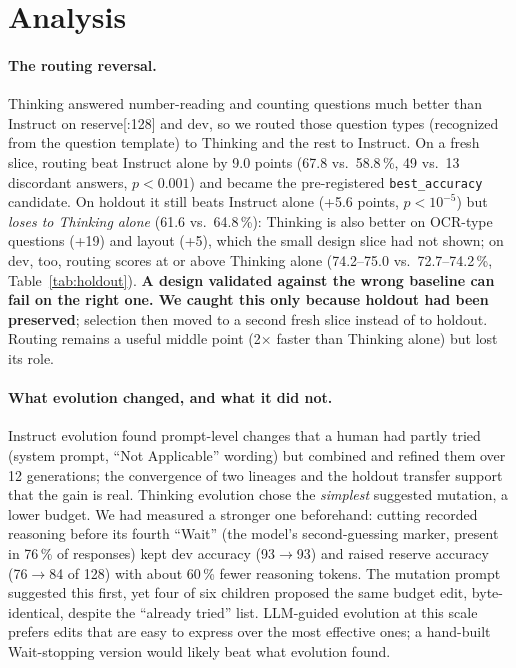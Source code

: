 \documentclass{article}
\begin{document}
\section{Analysis}

\paragraph{The routing reversal.} Thinking answered number-reading and counting questions much better than Instruct
on reserve[:128] and dev, so we routed those question types (recognized from the question template) to Thinking and
the rest to Instruct. On a fresh slice, routing beat Instruct alone by 9.0 points (67.8 vs.\ 58.8\,\%, 49 vs.\ 13
discordant answers, $p<0.001$) and became the pre-registered \texttt{best\_accuracy} candidate. On holdout it still
beats Instruct alone (+5.6 points, $p<10^{-5}$) but \emph{loses to Thinking alone} (61.6 vs.\ 64.8\,\%): Thinking is
also better on OCR-type questions (+19) and layout (+5), which the small design slice had not shown; on dev, too, routing scores at or above Thinking alone (74.2--75.0
vs.\ 72.7--74.2\,\%, Table~\ref{tab:holdout}). \textbf{A design
validated against the wrong baseline can fail on the right one. We caught this only because holdout had been
preserved}; selection then moved to a second fresh slice instead of to holdout. Routing remains a useful middle point
(2$\times$ faster than Thinking alone) but lost its role.

\paragraph{What evolution changed, and what it did not.} Instruct evolution found prompt-level changes that a human
had partly tried (system prompt, ``Not Applicable'' wording) but combined and refined them over 12 generations; the
convergence of two lineages and the holdout transfer support that the gain is real. Thinking evolution chose the
\emph{simplest} suggested mutation, a lower budget. We had measured a stronger one beforehand: cutting recorded
reasoning before its fourth ``Wait'' (the model's second-guessing marker, present in 76\,\% of responses) kept dev
accuracy (93$\rightarrow$93) and raised reserve accuracy (76$\rightarrow$84 of 128) with about 60\,\% fewer reasoning
tokens. The mutation prompt suggested this first, yet four of six children proposed the same budget edit,
byte-identical, despite the ``already tried'' list. LLM-guided evolution at this scale prefers edits that are easy to
express over the most effective ones; a hand-built Wait-stopping version would likely beat what evolution found.
\end{document}
